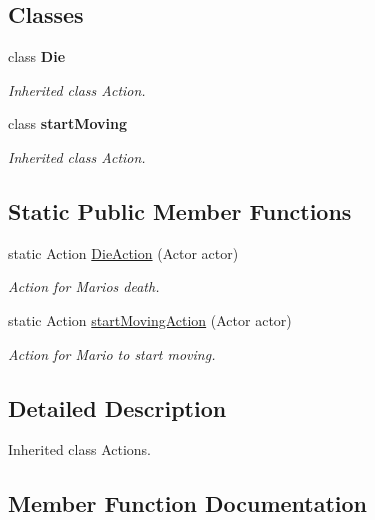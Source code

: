 \subsection*{Classes}
\begin{DoxyCompactItemize}
\item 
class {\bfseries Die}
\begin{DoxyCompactList}\small\item\em Inherited class Action. \end{DoxyCompactList}\item 
class {\bfseries start\+Moving}
\begin{DoxyCompactList}\small\item\em Inherited class Action. \end{DoxyCompactList}\end{DoxyCompactItemize}
\subsection*{Static Public Member Functions}
\begin{DoxyCompactItemize}
\item 
static Action \hyperlink{classnl_1_1arjanfrans_1_1mario_1_1actions_1_1MoveableActions_a470d03df0851eeaea55886b46dc82c90}{Die\+Action} (Actor actor)
\begin{DoxyCompactList}\small\item\em Action for Mario\textquotesingle{}s death. \end{DoxyCompactList}\item 
static Action \hyperlink{classnl_1_1arjanfrans_1_1mario_1_1actions_1_1MoveableActions_a0e2c6b25d672aec6c1f30a93b55bd0f9}{start\+Moving\+Action} (Actor actor)
\begin{DoxyCompactList}\small\item\em Action for Mario to start moving. \end{DoxyCompactList}\end{DoxyCompactItemize}


\subsection{Detailed Description}
Inherited class Actions. 

\subsection{Member Function Documentation}
\mbox{\label{classnl_1_1arjanfrans_1_1mario_1_1actions_1_1MoveableActions_a470d03df0851eeaea55886b46dc82c90}} 
